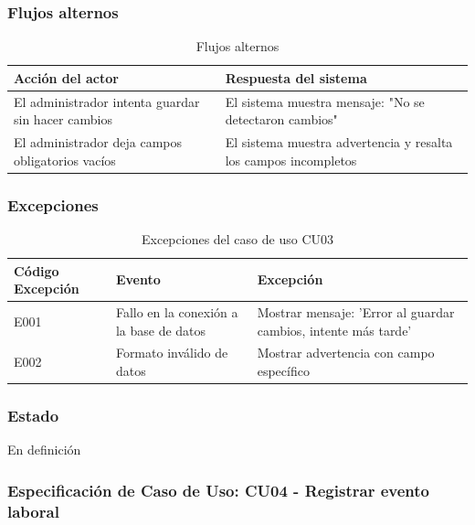 \subsubsection*{Flujos alternos}
\begin{table}[h]
	\centering
	\caption{Flujos alternos}
	\begin{tabular}{|p{7cm}|p{7cm}|}
		\hline
		\textbf{Acción del actor}                          & \textbf{Respuesta del sistema}                                  \\ \hline
		El administrador intenta guardar sin hacer cambios & El sistema muestra mensaje: "No se detectaron cambios"          \\ \hline
		El administrador deja campos obligatorios vacíos   & El sistema muestra advertencia y resalta los campos incompletos \\ \hline
	\end{tabular}
\end{table}

\subsubsection*{Excepciones}
\begin{table}[h]
	\centering
	\caption{Excepciones del caso de uso CU03}
	\begin{tabular}{|p{3cm}|p{5cm}|p{5cm}|}
		\hline
		\textbf{Código Excepción} & \textbf{Evento}                         & \textbf{Excepción}                                             \\ \hline
		E001                      & Fallo en la conexión a la base de datos & Mostrar mensaje: 'Error al guardar cambios, intente más tarde' \\ \hline
		E002                      & Formato inválido de datos               & Mostrar advertencia con campo específico                       \\ \hline
	\end{tabular}
\end{table}

\newpage

\subsubsection*{Estado}
En definición

\subsubsection*{Especificación de Caso de Uso: CU04 - Registrar evento laboral}

